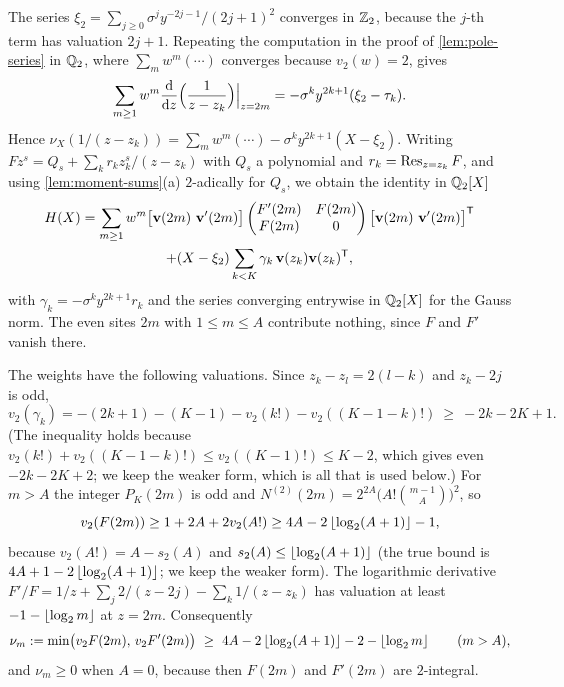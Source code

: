 The series $\xi_2=\sum_{j\ge0}\sigma^jy^{-2j-1}/(2j+1)^2$ converges in $\mathbb{Z}_2$, because the $j$-th
term has valuation $2j+1$. Repeating the computation in the proof of \cref{lem:pole-series} in
$\mathbb{Q}_2$, where $\sum_mw^m(\cdots)$ converges because $v_2(w)=2$, gives
\[
  \sum_{m\ge1}w^m\frac{\mathrm d}{\mathrm dz}\Bigl(\frac1{z-z_k}\Bigr)\Big|_{z=2m}
  =-\sigma^ky^{2k+1}(\xi_2-\tau_k).
\]
Hence $\nu_X(1/(z-z_k))=\sum_mw^m(\cdots)-\sigma^ky^{2k+1}(X-\xi_2)$. Writing
$Fz^s=Q_s+\sum_kr_kz_k^s/(z-z_k)$ with $Q_s$ a polynomial and $r_k=\operatorname*{Res}_{z=z_k}F$, and using
\cref{lem:moment-sums}(a) $2$-adically for $Q_s$, we obtain the identity in $\mathbb{Q}_2[X]$
\begin{multline}\label{eq:H-two-adic}
  H(X)=\sum_{m\ge1}w^m\bigl[\mathbf{v}(2m)\ \mathbf{v}'(2m)\bigr]
  \begin{pmatrix}F'(2m)&F(2m)\\F(2m)&0\end{pmatrix}
  \bigl[\mathbf{v}(2m)\ \mathbf{v}'(2m)\bigr]^{\mathsf T}\\
  +(X-\xi_2)\sum_{k<K}\gamma_k\,\mathbf{v}(z_k)\mathbf{v}(z_k)^{\mathsf T},
\end{multline}
with $\gamma_k=-\sigma^ky^{2k+1}r_k$ and the series converging entrywise in $\mathbb{Q}_2[X]$ for the
Gauss norm. The even sites $2m$ with $1\le m\le A$ contribute nothing, since $F$ and $F'$
vanish there.

The weights have the following valuations. Since $z_k-z_l=2(l-k)$ and $z_k-2j$ is odd,
\begin{equation}\label{eq:gamma-two}
  v_2(\gamma_k)=-(2k+1)-(K-1)-v_2(k!)-v_2((K-1-k)!)\ \ge\ -2k-2K+1 .
\end{equation}
(The inequality holds because $v_2(k!)+v_2((K-1-k)!)\le v_2((K-1)!)\le K-2$, which gives even
$-2k-2K+2$; we keep the weaker form, which is all that is used below.)
For $m>A$ the integer $P_K(2m)$ is odd and
$N^{(2)}(2m)=2^{2A}\bigl(A!\binom{m-1}A\bigr)^2$, so
\[
  v_2(F(2m))\ge1+2A+2v_2(A!)\ge 4A-2\left\lfloor \log_2(A+1)\right\rfloor-1 ,
\]
because $v_2(A!)=A-s_2(A)$ and $s_2(A)\le\left\lfloor \log_2(A+1)\right\rfloor$ (the true bound is
$4A+1-2\left\lfloor \log_2(A+1)\right\rfloor$; we keep the weaker form).
The logarithmic derivative $F'/F=1/z+\sum_j2/(z-2j)-\sum_k1/(z-z_k)$ has valuation at least
$-1-\left\lfloor \log_2m\right\rfloor$ at $z=2m$. Consequently
\begin{equation}\label{eq:nu-m}
  \nu_m:=\min\bigl(v_2F(2m),\,v_2F'(2m)\bigr)\ \ge\ 4A-2\floor{\log_2(A+1)}-2-\floor{\log_2 m}
  \qquad(m>A),
\end{equation}
and $\nu_m\ge0$ when $A=0$, because then $F(2m)$ and $F'(2m)$ are $2$-integral.

